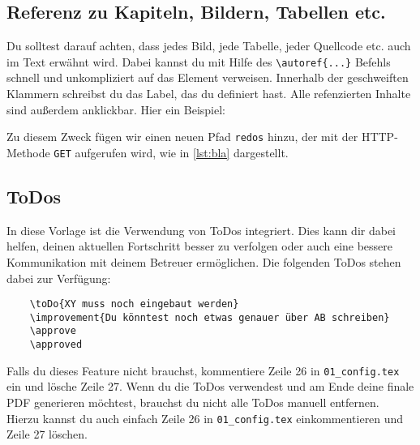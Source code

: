 \subsection{Referenz zu Kapiteln, Bildern, Tabellen etc.}
\label{sec:ref}
Du solltest darauf achten, dass jedes Bild, jede Tabelle, jeder Quellcode etc. auch im Text erwähnt wird.
Dabei kannst du mit Hilfe des \verb|\autoref{...}| Befehls schnell und unkompliziert auf das Element verweisen.
Innerhalb der geschweiften Klammern schreibst du das Label, das du definiert hast.
Alle refenzierten Inhalte sind außerdem anklickbar.
Hier ein Beispiel:

Zu diesem Zweck fügen wir einen neuen Pfad \texttt{redos} hinzu, der mit der HTTP-Methode \texttt{GET} aufgerufen wird, wie in \autoref{lst:bla} dargestellt.



\subsection{ToDos}
In diese Vorlage ist die Verwendung von ToDos integriert.
Dies kann dir dabei helfen, deinen aktuellen Fortschritt besser zu verfolgen oder auch eine bessere Kommunikation mit deinem Betreuer ermöglichen.
Die folgenden ToDos stehen dabei zur Verfügung:
\begin{verbatim}
    \toDo{XY muss noch eingebaut werden}
    \improvement{Du könntest noch etwas genauer über AB schreiben}
    \approve
    \approved
\end{verbatim}\noindent
{}
\approve
\approved
Falls du dieses Feature nicht brauchst, kommentiere Zeile 26 in \verb|01_config.tex| ein und lösche Zeile 27.
Wenn du die ToDos verwendest und am Ende deine finale PDF generieren möchtest, brauchst du nicht alle ToDos manuell entfernen. Hierzu kannst du auch einfach Zeile 26 in \verb|01_config.tex| einkommentieren und Zeile 27 löschen.